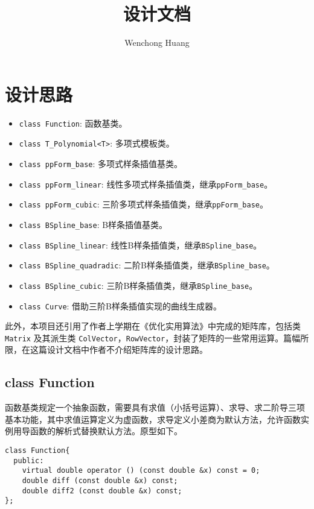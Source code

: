 \documentclass[lang=cn,11pt,a4paper]{elegantpaper}
\title{设计文档}
\author{Wenchong Huang}
\date{\zhtoday}
\begin{document}
\maketitle

\section{设计思路}

\begin{itemize}
  \item \verb|class Function|: 函数基类。
  \item \verb|class T_Polynomial<T>|: 多项式模板类。
  \item \verb|class ppForm_base|: 多项式样条插值基类。
  \item \verb|class ppForm_linear|: 线性多项式样条插值类，继承\verb|ppForm_base|。
  \item \verb|class ppForm_cubic|: 三阶多项式样条插值类，继承\verb|ppForm_base|。
  \item \verb|class BSpline_base|: B样条插值基类。
  \item \verb|class BSpline_linear|: 线性B样条插值类，继承\verb|BSpline_base|。
  \item \verb|class BSpline_quadradic|: 二阶B样条插值类，继承\verb|BSpline_base|。
  \item \verb|class BSpline_cubic|: 三阶B样条插值类，继承\verb|BSpline_base|。
  \item \verb|class Curve|: 借助三阶B样条插值实现的曲线生成器。
\end{itemize}

此外，本项目还引用了作者上学期在《优化实用算法》中完成的矩阵库，包括类 \verb|Matrix| 及其派生类 \verb|ColVector|，\verb|RowVector|，封装了矩阵的一些常用运算。篇幅所限，在这篇设计文档中作者不介绍矩阵库的设计思路。

\subsection{class Function}

函数基类规定一个抽象函数，需要具有求值（小括号运算）、求导、求二阶导三项基本功能，其中求值运算定义为虚函数，求导定义小差商为默认方法，允许函数实例用导函数的解析式替换默认方法。原型如下。

\begin{lstlisting}
class Function{
  public:
    virtual double operator () (const double &x) const = 0;
    double diff (const double &x) const;
    double diff2 (const double &x) const;
};
\end{lstlisting}
\end{document}
